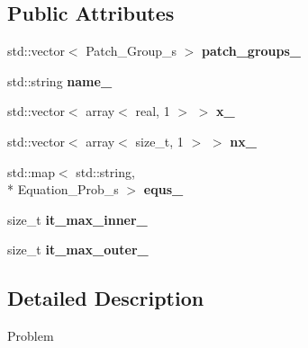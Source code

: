 \subsection*{Public Attributes}
\begin{DoxyCompactItemize}
\item 
\hypertarget{classProb_a63da8c35707c884a7f2960b18e8b5e30}{std\+::vector$<$ Patch\+\_\+\+Group\+\_\+s $>$ {\bfseries patch\+\_\+groups\+\_\+}}\label{classProb_a63da8c35707c884a7f2960b18e8b5e30}

\item 
\hypertarget{classProb_af34172c6eced00a603e92e0cf17e4953}{std\+::string {\bfseries name\+\_\+}}\label{classProb_af34172c6eced00a603e92e0cf17e4953}

\item 
\hypertarget{classProb_ac18ce288649f196b15137b88bfe374de}{std\+::vector$<$ array$<$ real, 1 $>$ $>$ {\bfseries x\+\_\+}}\label{classProb_ac18ce288649f196b15137b88bfe374de}

\item 
\hypertarget{classProb_a59f92ce7194950bf4c89d00af62c7b51}{std\+::vector$<$ array$<$ size\+\_\+t, 1 $>$ $>$ {\bfseries nx\+\_\+}}\label{classProb_a59f92ce7194950bf4c89d00af62c7b51}

\item 
\hypertarget{classProb_ac78ec4ce0542942cbfdb62e2737b149e}{std\+::map$<$ std\+::string, \\*
Equation\+\_\+\+Prob\+\_\+s $>$ {\bfseries equs\+\_\+}}\label{classProb_ac78ec4ce0542942cbfdb62e2737b149e}

\item 
\hypertarget{classProb_a4414250c2bd8f6aa6cfc9488c3993092}{size\+\_\+t {\bfseries it\+\_\+max\+\_\+inner\+\_\+}}\label{classProb_a4414250c2bd8f6aa6cfc9488c3993092}

\item 
\hypertarget{classProb_aa52011388c8c265ffc71c010a4b61f8f}{size\+\_\+t {\bfseries it\+\_\+max\+\_\+outer\+\_\+}}\label{classProb_aa52011388c8c265ffc71c010a4b61f8f}

\end{DoxyCompactItemize}


\subsection{Detailed Description}
Problem 

